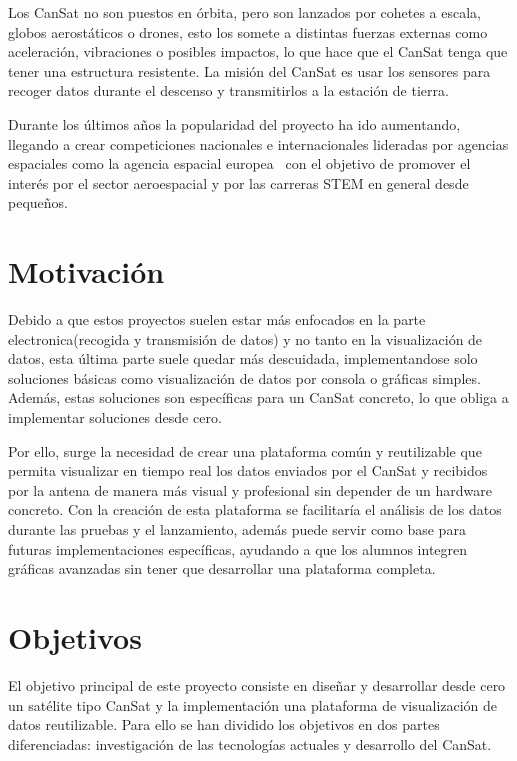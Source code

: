 Los CanSat no son puestos en órbita, pero son lanzados por cohetes a escala, globos aerostáticos o drones,
esto los somete a distintas fuerzas externas como aceleración, vibraciones o posibles impactos, lo que hace que el CanSat tenga que tener una estructura resistente.
La misión del CanSat es usar los sensores para recoger datos durante el descenso y transmitirlos a la estación de tierra.

Durante los últimos años la popularidad del proyecto ha ido aumentando, llegando a crear competiciones nacionales e internacionales lideradas por agencias espaciales como la agencia espacial europea~\cite{esa_cansat2024}
con el objetivo de promover el interés por el sector aeroespacial y por las carreras STEM en general desde pequeños.


\section{Motivación}
Debido a que estos proyectos suelen estar más enfocados en la parte electronica(recogida y transmisión de datos) y no tanto en la visualización de datos,
esta última parte suele quedar más descuidada, implementandose solo soluciones básicas como visualización de datos por consola o gráficas simples.
Además, estas soluciones son específicas para un CanSat concreto, lo que obliga a implementar soluciones desde cero.

Por ello, surge la necesidad de crear una plataforma común y reutilizable que permita visualizar en tiempo real los datos enviados por el CanSat y recibidos por la antena de manera más visual y profesional sin depender de un hardware concreto.
Con la creación de esta plataforma se facilitaría el análisis de los datos durante las pruebas y el lanzamiento,
además puede servir como base para futuras implementaciones específicas, ayudando a que los alumnos integren gráficas avanzadas sin tener que desarrollar una plataforma completa.


\section{Objetivos}
El objetivo principal de este proyecto consiste en diseñar y desarrollar desde cero un satélite tipo CanSat y la implementación una plataforma de visualización de datos reutilizable.
Para ello se han dividido los objetivos en dos partes diferenciadas: investigación de las tecnologías actuales y desarrollo del CanSat.

